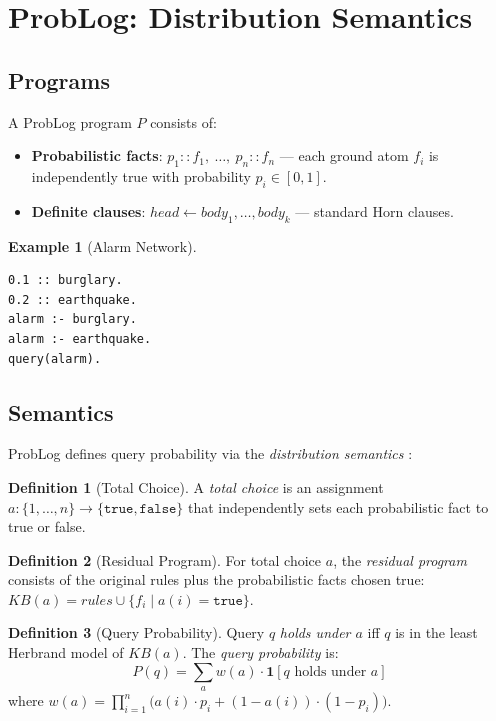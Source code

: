 \documentclass[11pt,a4paper]{article}
\theoremstyle{definition}
\newtheorem{definition}{Definition}[section]
\newtheorem{example}{Example}[section]
\begin{document}
\section{ProbLog: Distribution Semantics}

\subsection{Programs}

A ProbLog program $P$ consists of:
\begin{itemize}
\item \textbf{Probabilistic facts}: $p_1\!::\!f_1,\ \ldots,\ p_n\!::\!f_n$ ---
  each ground atom $f_i$ is independently true with probability $p_i \in [0,1]$.
\item \textbf{Definite clauses}: $\mathit{head} \leftarrow \mathit{body}_1, \ldots, \mathit{body}_k$ ---
  standard Horn clauses.
\end{itemize}

\begin{example}[Alarm Network]
\begin{lstlisting}
0.1 :: burglary.
0.2 :: earthquake.
alarm :- burglary.
alarm :- earthquake.
query(alarm).
\end{lstlisting}
\end{example}

\subsection{Semantics}

ProbLog defines query probability via the \emph{distribution semantics}
\cite{sato1995}:

\begin{definition}[Total Choice]
A \emph{total choice} is an assignment $a : \{1,\ldots,n\} \to \{\texttt{true},\texttt{false}\}$
that independently sets each probabilistic fact to true or false.
\end{definition}

\begin{definition}[Residual Program]
For total choice $a$, the \emph{residual program} consists of the original
rules plus the probabilistic facts chosen true: $\mathit{KB}(a) = \mathit{rules} \cup \{f_i \mid a(i) = \texttt{true}\}$.
\end{definition}

\begin{definition}[Query Probability]
Query $q$ \emph{holds under $a$} iff $q$ is in the least Herbrand model of $\mathit{KB}(a)$.
The \emph{query probability} is:
\[
P(q) = \sum_{a} w(a) \cdot \mathbf{1}[q \text{ holds under } a]
\]
where $w(a) = \prod_{i=1}^{n} \bigl(a(i) \cdot p_i + (1-a(i)) \cdot (1-p_i)\bigr)$.
\end{definition}
\end{document}
